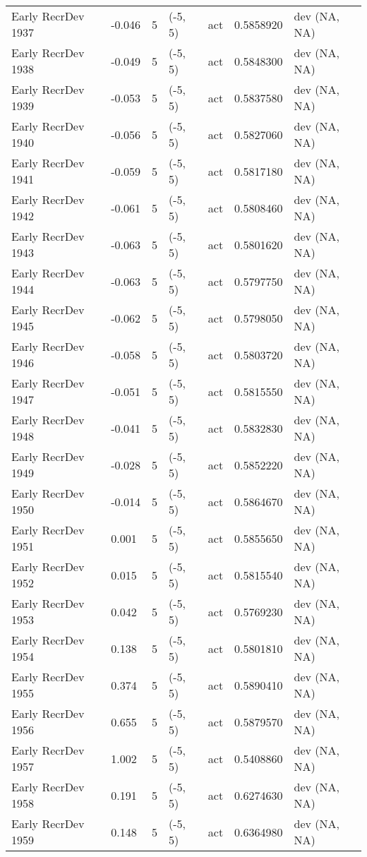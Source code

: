 \documentclass[11pt,
  english,
  letterpaper,
]{article}
\begin{document}
\begin{landscape}
\begin{longtable}[t]{>{\raggedright\arraybackslash}p{7cm}lllll>{\raggedright\arraybackslash}p{4cm}}
Early RecrDev 1937 & -0.046 & 5 & (-5, 5) & act & 0.5858920 & dev (NA, NA)\\
Early RecrDev 1938 & -0.049 & 5 & (-5, 5) & act & 0.5848300 & dev (NA, NA)\\
Early RecrDev 1939 & -0.053 & 5 & (-5, 5) & act & 0.5837580 & dev (NA, NA)\\
Early RecrDev 1940 & -0.056 & 5 & (-5, 5) & act & 0.5827060 & dev (NA, NA)\\
Early RecrDev 1941 & -0.059 & 5 & (-5, 5) & act & 0.5817180 & dev (NA, NA)\\
Early RecrDev 1942 & -0.061 & 5 & (-5, 5) & act & 0.5808460 & dev (NA, NA)\\
Early RecrDev 1943 & -0.063 & 5 & (-5, 5) & act & 0.5801620 & dev (NA, NA)\\
Early RecrDev 1944 & -0.063 & 5 & (-5, 5) & act & 0.5797750 & dev (NA, NA)\\
Early RecrDev 1945 & -0.062 & 5 & (-5, 5) & act & 0.5798050 & dev (NA, NA)\\
Early RecrDev 1946 & -0.058 & 5 & (-5, 5) & act & 0.5803720 & dev (NA, NA)\\
Early RecrDev 1947 & -0.051 & 5 & (-5, 5) & act & 0.5815550 & dev (NA, NA)\\
Early RecrDev 1948 & -0.041 & 5 & (-5, 5) & act & 0.5832830 & dev (NA, NA)\\
Early RecrDev 1949 & -0.028 & 5 & (-5, 5) & act & 0.5852220 & dev (NA, NA)\\
Early RecrDev 1950 & -0.014 & 5 & (-5, 5) & act & 0.5864670 & dev (NA, NA)\\
Early RecrDev 1951 & 0.001 & 5 & (-5, 5) & act & 0.5855650 & dev (NA, NA)\\
Early RecrDev 1952 & 0.015 & 5 & (-5, 5) & act & 0.5815540 & dev (NA, NA)\\
Early RecrDev 1953 & 0.042 & 5 & (-5, 5) & act & 0.5769230 & dev (NA, NA)\\
Early RecrDev 1954 & 0.138 & 5 & (-5, 5) & act & 0.5801810 & dev (NA, NA)\\
Early RecrDev 1955 & 0.374 & 5 & (-5, 5) & act & 0.5890410 & dev (NA, NA)\\
Early RecrDev 1956 & 0.655 & 5 & (-5, 5) & act & 0.5879570 & dev (NA, NA)\\
Early RecrDev 1957 & 1.002 & 5 & (-5, 5) & act & 0.5408860 & dev (NA, NA)\\
Early RecrDev 1958 & 0.191 & 5 & (-5, 5) & act & 0.6274630 & dev (NA, NA)\\
Early RecrDev 1959 & 0.148 & 5 & (-5, 5) & act & 0.6364980 & dev (NA, NA)\\

\end{longtable}
\end{landscape}
\end{document}
